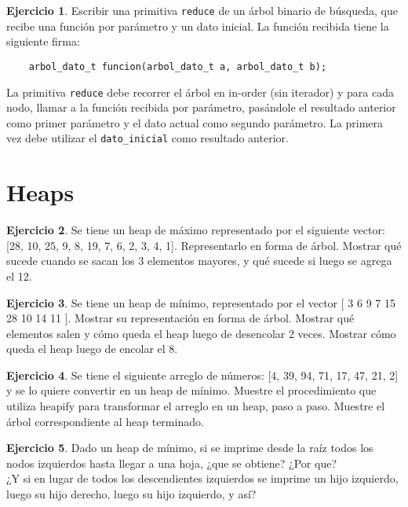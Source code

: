 \documentclass[11pt,a4paper]{article}
\theoremstyle{definition}
\newtheorem{ejercicio}{Ejercicio}[section]
\begin{document}
\begin{ejercicio}
Escribir una primitiva \lstinline!reduce! de un árbol binario de búsqueda, que
recibe una función por parámetro y un dato inicial.  La función recibida
tiene la siguiente firma:
\begin{lstlisting}
    arbol_dato_t funcion(arbol_dato_t a, arbol_dato_t b);
\end{lstlisting}

La primitiva \lstinline!reduce! debe recorrer el árbol en in-order (sin
iterador) y para cada nodo, llamar a la función recibida por parámetro,
pasándole el resultado anterior como primer parámetro y el dato actual como
segundo parámetro.  La primera vez debe utilizar el
\lstinline!dato_inicial! como resultado anterior.
\end{ejercicio}


\newpage
\section{Heaps}

\begin{ejercicio}
Se tiene un heap de máximo representado por el siguiente vector: [28, 10,
25, 9, 8, 19, 7, 6, 2, 3, 4, 1]. Representarlo en forma de árbol. Mostrar
qué sucede cuando se sacan los 3 elementos mayores, y qué sucede si luego
se agrega el 12.
\end{ejercicio}

\begin{ejercicio}
Se tiene un heap de mínimo, representado por el vector [ 3 6 9 7 15 28
10 14 11 ].
Mostrar su representación en forma de árbol.
Mostrar qué elementos salen y cómo queda el heap luego de desencolar 2
veces.
Mostrar cómo queda el heap luego de encolar el 8.
\end{ejercicio}

\begin{ejercicio}
Se tiene el siguiente arreglo de números: [4, 39, 94, 71, 17, 47, 21, 2]
y se lo quiere convertir en un heap de mínimo.  Muestre el procedimiento
que utiliza heapify para transformar el arreglo en un heap, paso a paso.
Muestre el árbol correspondiente al heap terminado.
\end{ejercicio}

\begin{ejercicio}
Dado un heap de mínimo, si se imprime desde la raíz todos los
nodos izquierdos hasta llegar a una hoja, ¿que se obtiene? ¿Por que? \\
¿Y si en lugar de todos los descendientes izquierdos se imprime
un hijo izquierdo, luego su hijo derecho, luego su hijo izquierdo, y
así?
\end{ejercicio}
\end{document}
